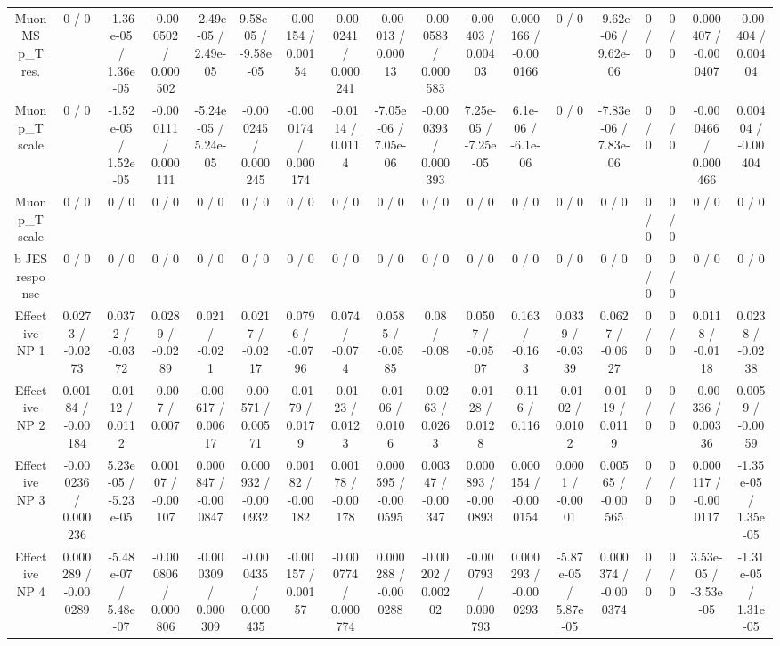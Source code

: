 \documentclass[10pt]{article}
\begin{document}
\begin{table}[htbp]
\begin{center}
\begin{tabular}{|c|c|c|c|c|c|c|c|c|c|c|c|c|c|c|c|c|c|}
  Muon MS p_{T} res. & 0 / 0 & -1.36e-05 / 1.36e-05 & -0.000502 / 0.000502 & -2.49e-05 / 2.49e-05 & 9.58e-05 / -9.58e-05 & -0.00154 / 0.00154 & -0.000241 / 0.000241 & -0.00013 / 0.00013 & -0.000583 / 0.000583 & -0.00403 / 0.00403 & 0.000166 / -0.000166 & 0 / 0 & -9.62e-06 / 9.62e-06 & 0 / 0 & 0 / 0 & 0.000407 / -0.000407 & -0.00404 / 0.00404 \\ 
  Muon p_{T} scale & 0 / 0 & -1.52e-05 / 1.52e-05 & -0.000111 / 0.000111 & -5.24e-05 / 5.24e-05 & -0.000245 / 0.000245 & -0.000174 / 0.000174 & -0.0114 / 0.0114 & -7.05e-06 / 7.05e-06 & -0.000393 / 0.000393 & 7.25e-05 / -7.25e-05 & 6.1e-06 / -6.1e-06 & 0 / 0 & -7.83e-06 / 7.83e-06 & 0 / 0 & 0 / 0 & -0.000466 / 0.000466 & 0.00404 / -0.00404 \\ 
  Muon p_{T} scale & 0 / 0 & 0 / 0 & 0 / 0 & 0 / 0 & 0 / 0 & 0 / 0 & 0 / 0 & 0 / 0 & 0 / 0 & 0 / 0 & 0 / 0 & 0 / 0 & 0 / 0 & 0 / 0 & 0 / 0 & 0 / 0 & 0 / 0 \\ 
  b JES response & 0 / 0 & 0 / 0 & 0 / 0 & 0 / 0 & 0 / 0 & 0 / 0 & 0 / 0 & 0 / 0 & 0 / 0 & 0 / 0 & 0 / 0 & 0 / 0 & 0 / 0 & 0 / 0 & 0 / 0 & 0 / 0 & 0 / 0 \\ 
  Effective NP 1 & 0.0273 / -0.0273 & 0.0372 / -0.0372 & 0.0289 / -0.0289 & 0.021 / -0.021 & 0.0217 / -0.0217 & 0.0796 / -0.0796 & 0.074 / -0.074 & 0.0585 / -0.0585 & 0.08 / -0.08 & 0.0507 / -0.0507 & 0.163 / -0.163 & 0.0339 / -0.0339 & 0.0627 / -0.0627 & 0 / 0 & 0 / 0 & 0.0118 / -0.0118 & 0.0238 / -0.0238 \\ 
  Effective NP 2 & 0.00184 / -0.00184 & -0.0112 / 0.0112 & -0.007 / 0.007 & -0.00617 / 0.00617 & -0.00571 / 0.00571 & -0.0179 / 0.0179 & -0.0123 / 0.0123 & -0.0106 / 0.0106 & -0.0263 / 0.0263 & -0.0128 / 0.0128 & -0.116 / 0.116 & -0.0102 / 0.0102 & -0.0119 / 0.0119 & 0 / 0 & 0 / 0 & -0.00336 / 0.00336 & 0.0059 / -0.0059 \\ 
  Effective NP 3 & -0.000236 / 0.000236 & 5.23e-05 / -5.23e-05 & 0.00107 / -0.00107 & 0.000847 / -0.000847 & 0.000932 / -0.000932 & 0.00182 / -0.00182 & 0.00178 / -0.00178 & 0.000595 / -0.000595 & 0.00347 / -0.00347 & 0.000893 / -0.000893 & 0.000154 / -0.000154 & 0.0001 / -0.0001 & 0.00565 / -0.00565 & 0 / 0 & 0 / 0 & 0.000117 / -0.000117 & -1.35e-05 / 1.35e-05 \\ 
  Effective NP 4 & 0.000289 / -0.000289 & -5.48e-07 / 5.48e-07 & -0.000806 / 0.000806 & -0.000309 / 0.000309 & -0.000435 / 0.000435 & -0.00157 / 0.00157 & -0.000774 / 0.000774 & 0.000288 / -0.000288 & -0.00202 / 0.00202 & -0.000793 / 0.000793 & 0.000293 / -0.000293 & -5.87e-05 / 5.87e-05 & 0.000374 / -0.000374 & 0 / 0 & 0 / 0 & 3.53e-05 / -3.53e-05 & -1.31e-05 / 1.31e-05 \\ 

\end{tabular}
\end{center}
\end{table}
\end{document}
